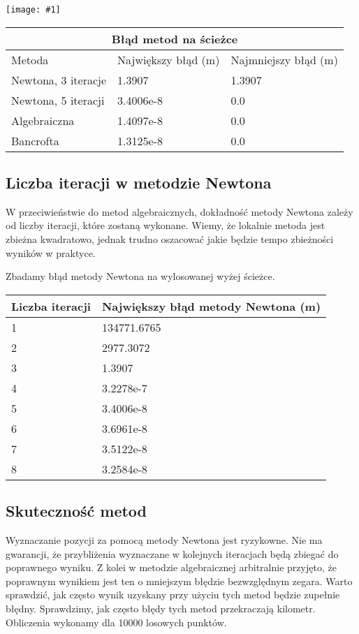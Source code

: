 \documentclass{article}
\newcommand{\plot}[1] {
	\texttt{[image: \#1]}
}
\begin{document}
\plot{sciezkiteoretyczne.png}
	
\begin{tabular}{ |p{3.5cm}|p{3.5cm}|p{3.5cm}|  }
 \hline
 \multicolumn{3}{|c|}{Błąd metod na ścieżce} \\
 \hline
 	Metoda    & Największy błąd (m) & Najmniejszy błąd (m)\\
 \hline
 	Newtona, 3 iteracje   & 1.3907    & 1.3907\\
 \hline
 	Newtona, 5 iteracji &   3.4006e-8 & 0.0 \\
 \hline
 	Algebraiczna & 1.4097e-8 & 0.0\\
 \hline
 	Bancrofta & 1.3125e-8 & 0.0\\
 \hline
\end{tabular}


\subsection{Liczba iteracji w metodzie Newtona}
\par W przeciwieństwie do metod algebraicznych, dokładność metody Newtona zależy od liczby iteracji, które zostaną wykonane. Wiemy, że lokalnie metoda jest zbieżna kwadratowo, jednak trudno oszacować jakie będzie tempo zbieżności wyników w praktyce. 

\par Zbadamy błąd metody Newtona na wylosowanej wyżej ścieżce.
	
\begin{tabular}{ |p{4cm}|p{6cm}|  }
 \hline
 	Liczba iteracji    & Największy błąd metody Newtona (m)\\
 \hline 
  	1 & 134771.6765 \\
 \hline 
 	2 & 2977.3072\\
 \hline 
 	3 & 1.3907\\
 \hline
 	4 & 3.2278e-7\\
 \hline 
 	5 & 3.4006e-8\\
 \hline 
 	6 & 3.6961e-8\\
 \hline 
 	7 & 3.5122e-8\\
 \hline
 	8 & 3.2584e-8\\
 \hline
\end{tabular}


\subsection{Skuteczność metod}
	Wyznaczanie pozycji za pomocą metody Newtona jest ryzykowne. Nie ma gwarancji, że przybliżenia wyznaczane w kolejnych iteracjach będą zbiegać do poprawnego wyniku. Z kolei w metodzie algebraicznej arbitralnie przyjęto, że poprawnym wynikiem jest ten o mniejszym błędzie bezwzględnym zegara. Warto sprawdzić, jak często wynik uzyskany przy użyciu tych metod będzie zupełnie błędny. Sprawdzimy, jak często błędy tych metod przekraczają kilometr. Obliczenia wykonamy dla 10000 losowych punktów. \\
	
\end{document}
